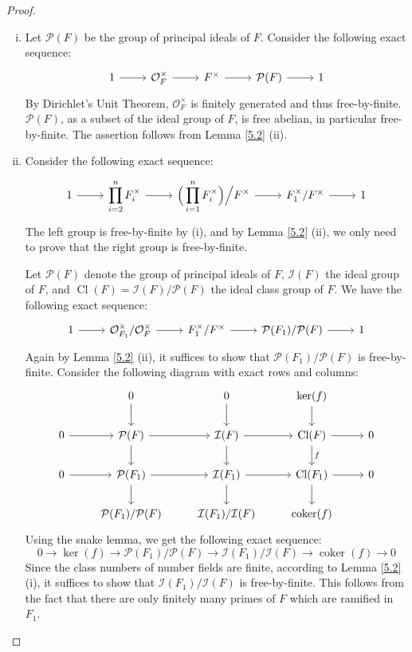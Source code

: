 \begin{proof}
\begin{enumerate}[(i)]
\item Let $\mathcal{P}(F)$ be the group of principal ideals of $F$. Consider the following exact sequence:
\[ \begin{tikzcd}
1 \ar[r] & \mathcal{O}_F^\times \ar[r] & F^\times \ar[r]& \mathcal{P}(F) \ar[r] & 1
\end{tikzcd} \]
By Dirichlet's Unit Theorem, $\mathcal{O}_F^\times$ is finitely generated and thus free-by-finite. $\mathcal{P}(F)$, as a subset of the ideal group of $F$, is free abelian, in particular free-by-finite. The assertion follows from Lemma \ref{5.2} (ii).
\item Consider the following exact sequence:
\[ \begin{tikzcd}
1 \ar[r] & \displaystyle \prod_{i=2}^{n} F_i^\times \ar[r]& \displaystyle \Big(\prod_{i=1}^{n}F_i^\times\Big)\Big/F^\times \ar[r]& F_1^\times/F^\times \ar[r]& 1
\end{tikzcd} \]
The left group is free-by-finite by (i), and by Lemma \ref{5.2} (ii), we only need to prove that the right group is free-by-finite.

Let $\mathcal{P}(F)$ denote the group of principal ideals of $F$, $\mathcal{I}(F)$ the ideal group of $F$, and $\operatorname{Cl}(F) = \mathcal{I}(F)/\mathcal{P}(F)$ the ideal class group of $F$. We have the following exact sequence:
\[ \begin{tikzcd}
1 \ar[r]& \mathcal{O}_{F_1}^\times /\mathcal{O}_F^\times\ar[r] & F_1^\times / F^\times\ar[r] & \mathcal{P}(F_1)/\mathcal{P}(F)\ar[r] & 1
\end{tikzcd} \]
Again by Lemma \ref{5.2} (ii), it suffices to show that $\mathcal{P}(F_1)/\mathcal{P}(F)$ is free-by-finite. 
Consider the following diagram with exact rows and columns:
\[ \begin{tikzcd}
& 0 \ar[d] & 0 \ar[d] & \ker(f) \ar[d]& \\
0\ar[r] & \mathcal{P}(F) \ar[d] \ar[r]& \mathcal{I}(F) \ar[r]\ar[d]& \operatorname{Cl}(F)\ar[r]\ar[d, "f"] & 0\\
0 \ar[r]& \mathcal{P}(F_1)\ar[d] \ar[r]& \mathcal{I}(F_1) \ar[d]\ar[r]& \operatorname{Cl}(F_1)\ar[d] \ar[r]& 0 \\
& \mathcal{P}(F_1)/\mathcal{P}(F) & \mathcal{I}(F_1)/\mathcal{I}(F) & \operatorname{coker}(f) &
\end{tikzcd} \]
Using the snake lemma, we get the following exact sequence:
\[
0 \longrightarrow \ker(f)\longrightarrow \mathcal{P}(F_1)/\mathcal{P}(F)\longrightarrow \mathcal{I}(F_1)/\mathcal{I}(F)
\longrightarrow \operatorname{coker}(f)\longrightarrow 0 \]
Since the class numbers of number fields are finite, according to Lemma \ref{5.2} (i), it suffices to show that $\mathcal{I}(F_1)/\mathcal{I}(F)$ is free-by-finite. This follows from the fact that there are only finitely many primes of $F$ which are ramified in $F_1$.\qedhere
\end{enumerate}
\end{proof}

